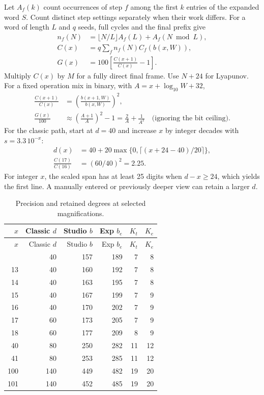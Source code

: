 \documentclass[11pt,a4paper]{article}
\numberwithin{equation}{section}
\newlength{\TW}
\newcommand{\tableformat}[1]{\small\setlength{\tabcolsep}{4pt}%
  \renewcommand{\arraystretch}{1.20}\setlength{\TW}{\dimexpr\textwidth-#1pt\relax}}
\begin{document}
Let \(A_f(k)\) count occurrences of step \(f\) among the first \(k\)
entries of the expanded word \(S\). Count distinct step settings
separately when their work differs. For a word of length \(L\) and
\(q\) seeds, full cycles and the final prefix give
\begin{align}
  n_f(N)&=\lfloor N/L\rfloor A_f(L)+A_f(N\bmod L),\\
  C(x)&=q\sum_f n_f(N)C_f(b(x,W)),\\
  G(x)&=100\left[\frac{C(x+1)}{C(x)}-1\right].
\end{align}
Multiply \(C(x)\) by \(M\) for a fully direct final frame. Use
\(N+24\) for Lyapunov. For a fixed operation mix in binary, with
\(A=x+\log_{10}W+32\),
\begin{align}
  \frac{C(x+1)}{C(x)}
    &=\left(\frac{b(x+1,W)}{b(x,W)}\right)^2,\\
  \frac{G(x)}{100}
    &\approx\left(\frac{A+1}{A}\right)^2-1
     =\frac{2}{A}+\frac{1}{A^2}
     \quad\text{(ignoring the bit ceiling)}.
\end{align}
For the classic path, start at \(d=40\) and increase \(x\) by
integer decades with \(s=3.3\,10^{-x}\):
\begin{align}
  d(x)&=40+20\max\{0,\lceil(x+24-40)/20\rceil\},\\
  \frac{C(17)}{C(16)}&=(60/40)^2=2.25.
\end{align}
For integer \(x\), the scaled span has at least 25 digits when
\(d-x\ge24\), which yields the first line. A manually entered or
previously deeper view can retain a larger \(d\).

\begingroup\tableformat{40}
\begin{longtable}{@{}R{.15\TW}R{.17\TW}R{.17\TW}R{.17\TW}R{.17\TW}R{.17\TW}@{}}
\caption{Precision and retained degrees at selected magnifications.}\label{tab:bits}\\
\toprule \(x\) & Classic \(d\) & Studio \(b\) & Exp \(b_e\) & \(K_t\) & \(K_e\)\\
\midrule\endfirsthead
\toprule \(x\) & Classic \(d\) & Studio \(b\) & Exp \(b_e\) & \(K_t\) & \(K_e\)\\\midrule\endhead
\bottomrule{} & 40 & 157 & 189 & 7 & 8\\
13 & 40 & 160 & 192 & 7 & 8\\
14 & 40 & 163 & 195 & 7 & 8\\
15 & 40 & 167 & 199 & 7 & 9\\
16 & 40 & 170 & 202 & 7 & 9\\
17 & 60 & 173 & 205 & 7 & 9\\
18 & 60 & 177 & 209 & 8 & 9\\
40 & 80 & 250 & 282 & 11 & 12\\
41 & 80 & 253 & 285 & 11 & 12\\
100 & 140 & 449 & 482 & 19 & 20\\
101 & 140 & 452 & 485 & 19 & 20\\
\end{longtable}
\endgroup
\end{document}
